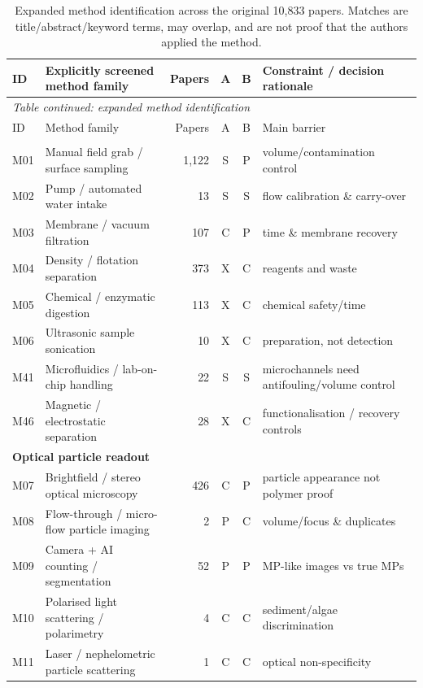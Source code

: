 \small
\begin{longtable}{@{}p{.8cm}p{6.0cm}rccp{5.4cm}@{}}
\caption{Expanded method identification across the original 10,833 papers. Matches are title/abstract/keyword terms, may overlap, and are not proof that the authors applied the method.}\label{tab:allmethods}\\
\toprule ID & Explicitly screened method family & Papers & A & B & Constraint / decision rationale \\\midrule
\endfirsthead
\multicolumn{6}{l}{\emph{Table continued: expanded method identification}}\\\toprule
ID & Method family & Papers & A & B & Main barrier \\\midrule
\endhead
\bottomrule\endfoot
\multicolumn{6}{l}{\textbf{Collection / pretreatment}}\\[2pt]
M01 & Manual field grab / surface sampling & 1,122 & S & P & volume/contamination control \\
M02 & Pump / automated water intake & 13 & S & S & flow calibration \& carry-over \\
M03 & Membrane / vacuum filtration & 107 & C & P & time \& membrane recovery \\
M04 & Density / flotation separation & 373 & X & C & reagents and waste \\
M05 & Chemical / enzymatic digestion & 113 & X & C & chemical safety/time \\
M06 & Ultrasonic sample sonication & 10 & X & C & preparation, not detection \\
M41 & Microfluidics / lab-on-chip handling & 22 & S & S & microchannels need antifouling/volume control \\
M46 & Magnetic / electrostatic separation & 28 & X & C & functionalisation / recovery controls \\
\multicolumn{6}{l}{\textbf{Optical particle readout}}\\[2pt]
M07 & Brightfield / stereo optical microscopy & 426 & C & P & particle appearance not polymer proof \\
M08 & Flow-through / micro-flow particle imaging & 2 & P & C & volume/focus \& duplicates \\
M09 & Camera + AI counting / segmentation & 52 & P & P & MP-like images vs true MPs \\
M10 & Polarised light scattering / polarimetry & 4 & C & C & sediment/algae discrimination \\
M11 & Laser / nephelometric particle scattering & 1 & C & C & optical non-specificity \\

\end{longtable}
